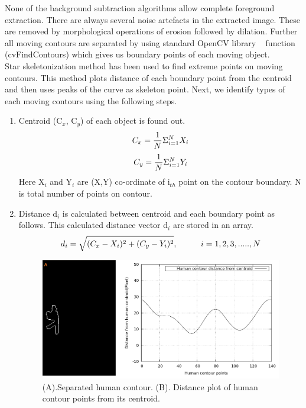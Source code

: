 \documentclass[conference]{IEEEtran}
\begin{document}
\indent None of the background subtraction algorithms allow complete
foreground extraction. There are always several noise artefacts in the
extracted image. These are removed by morphological operations of
erosion followed by dilation. Further all moving contours are separated
by using standard OpenCV library ~\cite{12} function (cvFindContours)
which gives us boundary points of each moving object.\\

\indent Star skeletonization method has been used to find extreme points
on moving contours. This method plots distance of each boundary point
from the centroid and then uses peaks of the curve as skeleton point.
Next, we identify types of each moving contours using the following
steps.\\
\begin{enumerate}
\item Centroid (C$_x$, C$_y$) of each object is found out.\\
	\begin{equation}
	C_x = {1 \over N} \Sigma ^N _{i = 1} X_i 
	\end{equation}
	\begin{equation}
	C_y = {1 \over N} \Sigma ^N _{i = 1} Y_i 
	\end{equation}
Here X$_i$ and Y$_i$ are (X,Y) co-ordinate of i$_{th}$ point on the contour
boundary. N is total number of points on contour.
\item Distance d$_i$ is calculated between centroid and each boundary
point as follows. This calculated distance vector d$_i$ are stored in an
array.
	\begin{equation}
	d_i = \sqrt{(C_x - X_i)^2 + (C_y - Y_i)^2}, \hspace{10 mm} i =
1,2,3,.....,N
	\end{equation}

\begin{figure}[!h]
\centering
\includegraphics[scale=0.35]{figures/distance}
\caption{(A).Separated human contour. (B). Distance plot of human contour
points from its centroid.}
\label{distance}
\end{figure}


\end{enumerate}
\end{document}
